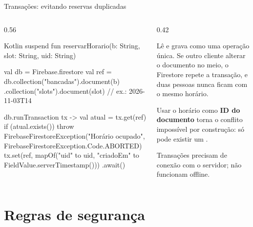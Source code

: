 \documentclass[aspectratio=169,10pt]{beamer}
\begin{document}
\begin{frame}[fragile]{Transações: evitando reservas duplicadas}
  \begin{columns}[T]
    \begin{column}{0.56\textwidth}
\begin{codigo}[title=Reserva atômica]{Kotlin}
suspend fun reservarHorario(b: String, slot: String,
                            uid: String) {
  val db = Firebase.firestore
  val ref = db.collection("bancadas").document(b)
    .collection("slots").document(slot)  // ex.: 2026-11-03T14

  db.runTransaction { tx ->
    val atual = tx.get(ref)
    if (atual.exists()) {
      throw FirebaseFirestoreException("Horário ocupado",
        FirebaseFirestoreException.Code.ABORTED)
    }
    tx.set(ref, mapOf("uid" to uid,
      "criadoEm" to FieldValue.serverTimestamp()))
  }.await()
}
\end{codigo}
    \end{column}
    \begin{column}{0.42\textwidth}
      \begin{conceito}[Transação]
        Lê e grava como uma operação única. Se outro cliente alterar o documento no meio, o Firestore repete a transação, e duas pessoas nunca ficam com o mesmo horário.
      \end{conceito}
      \begin{dica}[Modelagem]
        Usar o horário como \textbf{ID do documento} torna o conflito impossível por construção: só pode existir um .
      \end{dica}
      \begin{atencao}
        Transações precisam de conexão com o servidor; não funcionam offline.
      \end{atencao}
    \end{column}
  \end{columns}
\end{frame}

\section{Regras de segurança}
\end{document}
